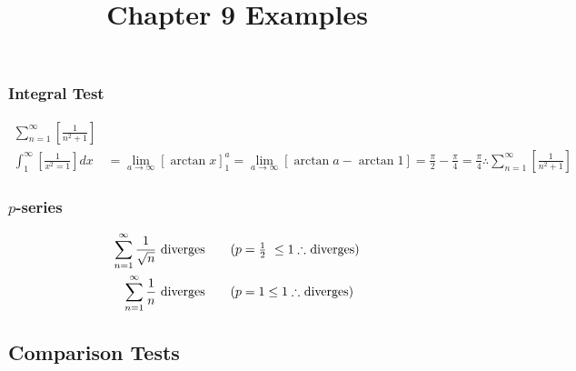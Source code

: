 \documentclass[12pt, A4]{article}
\title{Chapter 9 Examples}
\begin{document}
	\setcounter{section}{9}
	\setcounter{subsection}{2}
	\subsection{}
	\subsubsection*{Integral Test}
		\begin{align*}
			\sum_{n = 1}^\infty\left[\frac{1}{n^2 + 1}\right] \tag{is always positive, continuous, and decreases as \(n\) grows} \\
			\int_1^\infty\left[\frac{1}{x^2 = 1}\right]dx &= \lim_{a\to\infty}[\arctan{x}]_1^a = \lim_{a\to\infty}[\arctan{a} - \arctan{1}] = \frac{\pi}{2} - \frac{\pi}{4} = \frac{\pi}{4} \therefore \sum_{n = 1}^\infty\left[\frac{1}{n^2 + 1}\right]
		\end{align*}
	\subsubsection*{$p$-series}
		\begin{align*}
			\sum_{n = 1}^\infty\frac{1}{\sqrt{n}} &\text{ diverges} \tag{\(p = \frac{1}{2}\ \le 1 \therefore \) diverges} \\
			\sum_{n = 1}^\infty\frac{1}{n} &\text{ diverges} \tag{\(p = 1 \le 1 \therefore\) diverges}
		\end{align*}
	\subsection{Comparison Tests}
\end{document}
